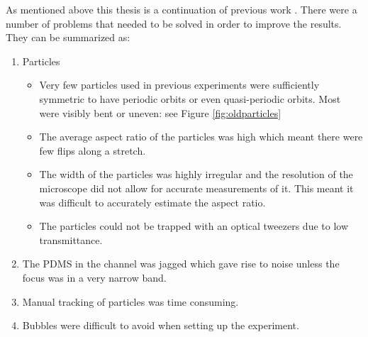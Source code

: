 As mentioned above this thesis is a continuation of previous work \cite{AntonThesis, JonasExperiment, Mishra}. There were a number of problems that needed to be solved in order to improve the results. They can be summarized as:
\begin{enumerate} \label{list:problems}
	\item Particles 
	\begin{itemize}
		\item Very few particles used in previous experiments were sufficiently symmetric to have periodic orbits or even quasi-periodic orbits. Most were visibly bent or uneven: see Figure \ref{fig:oldparticles}
		\item The average aspect ratio of the particles was high which meant there were few flips along a stretch.
		\item The width of the particles was highly irregular and the resolution of the microscope did not allow for accurate measurements of it. This meant it was difficult to accurately estimate the aspect ratio.
		\item The particles could not be trapped with an optical tweezers due to low transmittance.
	\end{itemize}
	\item The PDMS in the channel was jagged which gave rise to noise unless the focus was in a very narrow band.
	\item Manual tracking of particles was time consuming.
	\item Bubbles were difficult to avoid when setting up the experiment.
\end{enumerate}